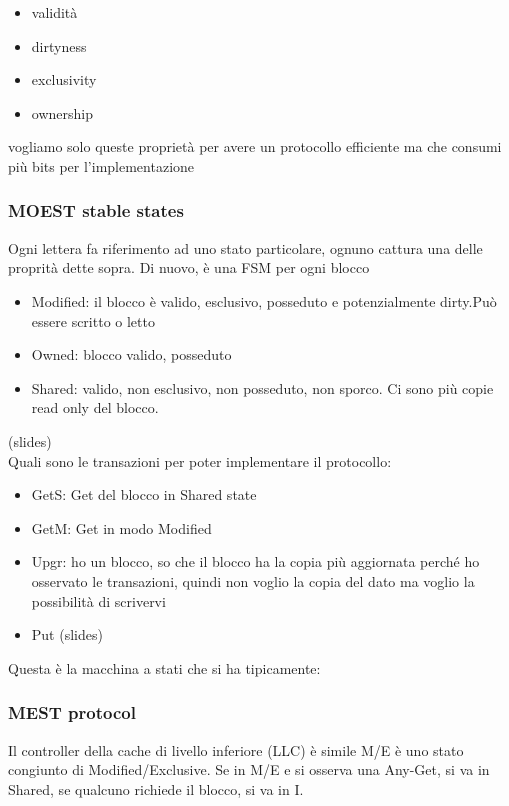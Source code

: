 \documentclass[12pt, oneside]{extbook} %
\begin{document}
\begin{itemize}
\item validità
\item dirtyness
\item exclusivity
\item ownership
\end{itemize}
vogliamo solo queste proprietà per avere un protocollo efficiente ma che consumi più bits per l'implementazione
\subsubsection{MOEST stable states}
Ogni lettera fa riferimento ad uno stato particolare, ognuno cattura una delle proprità dette sopra. Di nuovo, è una FSM per ogni blocco
\begin{itemize}
\item Modified: il blocco è valido, esclusivo, posseduto e potenzialmente dirty.Può essere scritto o letto
\item Owned: blocco valido, posseduto 
\item Shared: valido, non esclusivo, non posseduto, non sporco. Ci sono più copie read only del blocco.
\end{itemize}
(slides)\\ Quali sono le transazioni per poter implementare il protocollo:
\begin{itemize}
\item GetS: Get del blocco in Shared state
\item GetM: Get in modo Modified
\item Upgr: ho un blocco, so che il blocco ha la copia più aggiornata perché ho osservato le transazioni, quindi non voglio la copia del dato ma voglio la possibilità di scrivervi
\item Put (slides)
\end{itemize}
Questa è la macchina a stati che si ha tipicamente: 
\subsubsection{MEST protocol}
Il controller della cache di livello inferiore (LLC) è simile 
M/E è uno stato congiunto di Modified/Exclusive. Se in M/E e si osserva una Any-Get, si va in Shared, se qualcuno richiede il blocco, si va in I.
\end{document}
